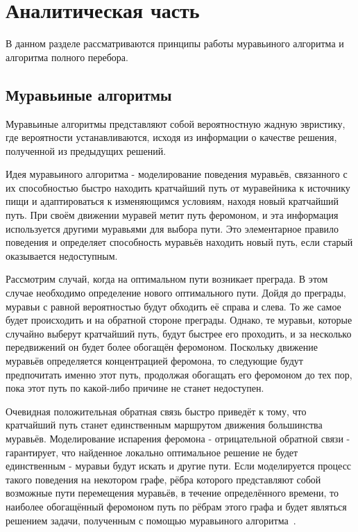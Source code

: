 \documentclass[12pt]{report}
\begin{document}
    \chapter{Аналитическая часть}	
    В данном разделе рассматриваются принципы работы муравьиного алгоритма и алгоритма полного перебора.
    
    \section{Муравьиные алгоритмы}
    Муравьиные алгоритмы представляют собой вероятностную жадную эвристику, где вероятности устанавливаются, исходя из информации о качестве решения, полученной из предыдущих решений.
    
    Идея муравьиного алгоритма - моделирование поведения муравьёв, связанного с их способностью быстро находить кратчайший путь от муравейника к источнику пищи и адаптироваться к изменяющимся условиям, находя новый кратчайший путь. При своём движении муравей метит путь феромоном, и эта информация используется другими муравьями для выбора пути. Это элементарное правило поведения и определяет способность муравьёв находить новый путь, если старый оказывается недоступным.
    
    Рассмотрим случай, когда на оптимальном пути возникает преграда. В этом случае необходимо определение нового оптимального пути. Дойдя до преграды, муравьи с равной вероятностью будут обходить её справа и слева. То же самое будет происходить и на обратной стороне преграды. Однако, те муравьи, которые случайно выберут кратчайший путь, будут быстрее его проходить, и за несколько передвижений он будет более обогащён феромоном. Поскольку движение муравьёв определяется концентрацией феромона, то следующие будут предпочитать именно этот путь, продолжая обогащать его феромоном до тех пор, пока этот путь по какой-либо причине не станет недоступен.
    
    Очевидная положительная обратная связь быстро приведёт к тому, что кратчайший путь станет единственным маршрутом движения большинства муравьёв. Моделирование испарения феромона - отрицательной обратной связи - гарантирует, что найденное локально оптимальное решение не будет единственным - муравьи будут искать и другие пути. Если моделируется процесс такого поведения на некотором графе, рёбра которого представляют собой возможные пути перемещения муравьёв, в течение определённого времени, то наиболее обогащённый феромоном путь по рёбрам этого графа и будет являться решением задачи, полученным с помощью муравьиного алгоритма~\cite{2}.
    
\end{document}
